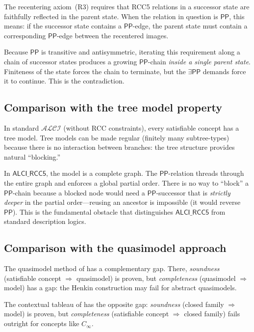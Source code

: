 \documentclass[11pt]{article}
\theoremstyle{definition}
\newcommand{\ALCIRCC}{\mathsf{ALCI\_RCC5}}
\newcommand{\Pp}{\mathsf{PP}}
\begin{document}
The recentering axiom~(R3) requires that RCC5 relations in a successor
state are faithfully reflected in the parent state.  When the relation
in question is $\Pp$, this means: if the successor state contains a
$\Pp$-edge, the parent state must contain a corresponding $\Pp$-edge
between the recentered images.

Because $\Pp$ is transitive and antisymmetric, iterating this
requirement along a chain of successor states produces a growing
$\Pp$-chain \emph{inside a single parent state}.  Finiteness of the
state forces the chain to terminate, but the $\exists\Pp$ demands
force it to continue.  This is the contradiction.

\subsection{Comparison with the tree model property}

In standard $\mathcal{ALCI}$ (without RCC constraints), every
satisfiable concept has a tree model.  Tree models can be made
regular (finitely many subtree-types) because there is no interaction
between branches: the tree structure provides natural ``blocking.''

In $\ALCIRCC$, the model is a complete graph.  The $\Pp$-relation
threads through the entire graph and enforces a global partial order.
There is no way to ``block'' a $\Pp$-chain because a blocked node
would need a $\Pp$-successor that is \emph{strictly deeper} in the
partial order---reusing an ancestor is impossible (it would reverse
$\Pp$).  This is the fundamental obstacle that distinguishes
$\ALCIRCC$ from standard description logics.

\subsection{Comparison with the quasimodel approach}

The quasimodel method of \cite{Claude2026} has a complementary gap.
There, \emph{soundness} (satisfiable concept $\Rightarrow$
quasimodel) is proven, but \emph{completeness} (quasimodel
$\Rightarrow$ model) has a gap: the Henkin construction may fail for
abstract quasimodels.

The contextual tableau of \cite{GPT2026} has the opposite gap:
\emph{soundness} (closed family $\Rightarrow$ model) is proven, but
\emph{completeness} (satisfiable concept $\Rightarrow$ closed family)
fails outright for concepts like $C_\infty$.
\end{document}
